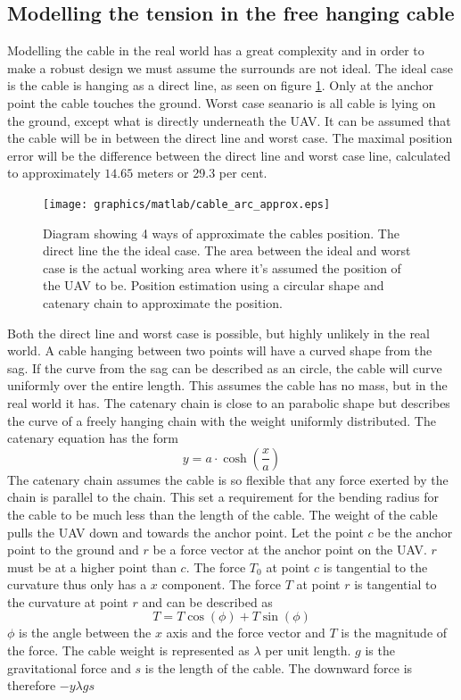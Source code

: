 \subsection{Modelling the tension in the free hanging cable}
Modelling the cable in the real world has a great complexity and in order to make a robust design we must assume the surrounds are not ideal. The ideal case is the cable is hanging as a direct line, as seen on figure \ref{fig:cable_model_cases}. Only at the anchor point the cable touches the ground. Worst case seanario is all cable is lying on the ground, except what is directly underneath the UAV. It can be assumed that the cable will be in between the direct line and worst case. The maximal position error will be the difference between the direct line and worst case line, calculated to approximately $14.65$ meters or 29.3 per cent. 

\begin{figure}[H]
\centering
\texttt{[image: graphics/matlab/cable\_arc\_approx.eps]}
\caption[Diagram showing 4 ways of approximate the cables position.]{Diagram showing 4 ways of approximate the cables position. The direct line the the ideal case. The area between the ideal and worst case is the actual working area where it's assumed the position of the UAV to be. Position estimation using a circular shape and catenary chain to approximate the position.}
\label{fig:cable_model_cases}
\end{figure}

\noindent
Both the direct line and worst case is possible, but highly unlikely in the real world. A cable hanging between two points will have a curved shape from the sag. If the curve from the sag can be described as an circle, the cable will curve uniformly over the entire length. This assumes the cable has no mass, but in the real world it has.
The catenary chain is close to an parabolic shape but describes the curve of a freely hanging chain with the weight uniformly distributed\cite{Whewelll1833}. The catenary equation has the form
\begin{equation}
y = a \cdot \cosh\left(\frac{x}{a}\right)
\end{equation}
The catenary chain assumes the cable is so flexible that any force exerted by the chain is parallel to the chain. This set a requirement for the bending radius for the cable to be much less than the length of the cable.
The weight of the cable pulls the UAV down and towards the anchor point. Let the point $c$ be the anchor point to the ground and $r$ be a force vector at the anchor point on the UAV. $r$ must be at a higher point than $c$. The force $T_0$ at point $c$ is tangential to the curvature thus only has a $x$ component. The force $T$ at point $r$ is tangential to the curvature at point $r$ and can be described as
\begin{equation}
T = T \cos(\phi) +  T\sin(\phi)
\end{equation} 
$\phi$ is the angle between the $x$ axis and the force vector and $T$ is the magnitude of the force. The cable weight is represented as $\lambda$ per unit length. $g$ is the gravitational force and $s$ is the length of the cable. The downward force is therefore $-y \lambda g s$

